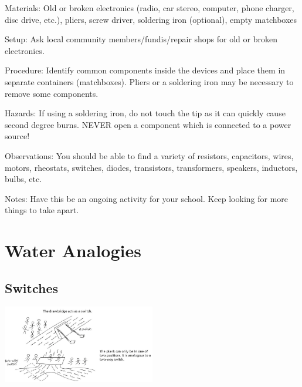 \begin{multicols}{2}
\begin{description*}
\item[Materials:]{Old or broken electronics (radio, car stereo, computer, phone charger, disc drive, etc.), pliers, screw driver, soldering iron (optional), empty matchboxes}
\item[Setup:]{Ask local community members/fundis/repair shops for old or broken electronics. }
\item[Procedure:]{Identify common components inside the devices and place them in separate containers (matchboxes). Pliers or a soldering iron may be necessary to remove some components.}
\item[Hazards:]{If using a soldering iron, do not touch the tip as it can quickly cause second degree burns. NEVER open a component which is connected to a power source!}
\item[Observations:]{You should be able to find a variety of resistors, capacitors, wires, motors, rheostats, switches, diodes, transistors, transformers, speakers, inductors, bulbs, etc.}
\item[Notes:]{Have this be an ongoing activity for your school. Keep looking for more things to take apart.}
\end{description*}


\section*{Water Analogies}


\subsection*{Switches}

\begin{center}
\includegraphics[width=0.5\textwidth]{./img/vso/analogy-switch.png}
\end{center}



\end{multicols}

